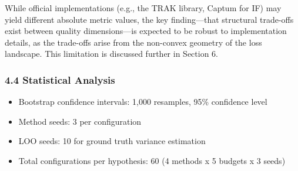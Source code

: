 While official implementations (e.g., the TRAK library, Captum for IF) may yield different absolute metric values, the key finding---that structural trade-offs exist between quality dimensions---is expected to be robust to implementation details, as the trade-offs arise from the non-convex geometry of the loss landscape. This limitation is discussed further in Section 6.

\subsubsection{4.4 Statistical Analysis}

\begin{itemize}
\item Bootstrap confidence intervals: 1,000 resamples, 95\% confidence level
\item Method seeds: 3 per configuration
\item LOO seeds: 10 for ground truth variance estimation
\item Total configurations per hypothesis: 60 (4 methods x 5 budgets x 3 seeds)
\end{itemize}
